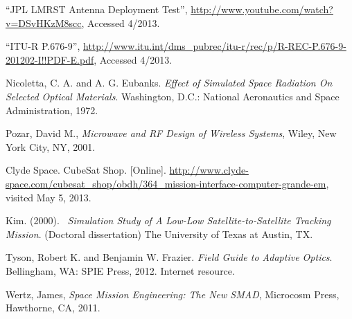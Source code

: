 \documentclass[12pt]{article}
\begin{document}
\begin{thebibliography}{9}
``JPL LMRST Antenna Deployment Test'', \url{http://www.youtube.com/watch?v=DSvHKzM8scc}, Accessed 4/2013.

``ITU-R P.676-9'', \url{http://www.itu.int/dms_pubrec/itu-r/rec/p/R-REC-P.676-9-201202-I!!PDF-E.pdf}, Accessed 4/2013.

   Nicoletta, C. A. and A. G. Eubanks.
   \emph{Effect of Simulated Space Radiation On Selected Optical Materials}. Washington, D.C.: National Aeronautics and Space Administration, 1972.

Pozar, David M., \emph{Microwave and RF Design of Wireless Systems}, Wiley, New York City, NY, 2001.



Clyde Space. CubeSat Shop. [Online]. \url{http://www.clyde-space.com/cubesat_shop/obdh/364_mission-interface-computer-grande-em}, visited May 5, 2013. 





   Kim. (2000).
  \emph{\ Simulation Study of A Low-Low Satellite-to-Satellite Tracking Mission}. (Doctoral dissertation)
  The University of Texas at Austin, TX.

   Tyson, Robert K. and Benjamin W. Frazier. 
   \emph{Field Guide to Adaptive Optics}. Bellingham, WA: SPIE Press, 2012.  Internet resource.

Wertz, James, \emph{Space Mission Engineering: The New SMAD}, Microcosm Press, Hawthorne, CA, 2011.


\end{thebibliography}
\end{document}

